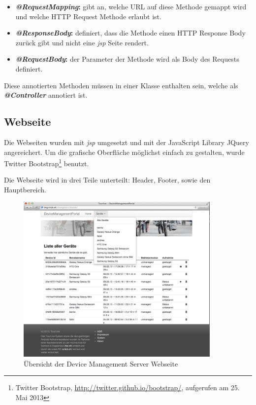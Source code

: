 \begin{itemize}
\item \textbf{\textit{@RequestMapping}:} gibt an, welche URL auf diese Methode gemappt wird und welche HTTP Request Methode erlaubt ist.
\item\textbf{\textit{@ResponseBody}: } definiert, dass die Methode einen HTTP Response Body zurück gibt und nicht eine \textit{\gls{jsp}} Seite rendert.
\item\textbf{\textit{@RequestBody}: } der Parameter der Methode wird als Body des Requests definiert.
\end{itemize}
Diese annotierten Methoden müssen in einer Klasse enthalten sein, welche als \textit{\textbf{@Controller}} annotiert ist.


\subsection{Webseite}
Die Webseiten wurden mit \textit{\gls{jsp}} umgesetzt und mit der JavaScript Library JQuery angereichert. Um die grafische Oberfläche möglichst einfach zu gestalten, wurde  Twitter Bootstrap\footnote{Twitter Bootstrap, \url{http://twitter.github.io/bootstrap/}, aufgerufen am 25. Mai 2013} benutzt.

Die Webseite wird in drei Teile unterteilt: Header, Footer, sowie den Hauptbereich. 

\begin{figure}[H]
	\centering
	\includegraphics[width=100mm]{images/devmgmtsrv/all.png}
	\caption{Übersicht der Device Management Server Webseite}
\end{figure}

